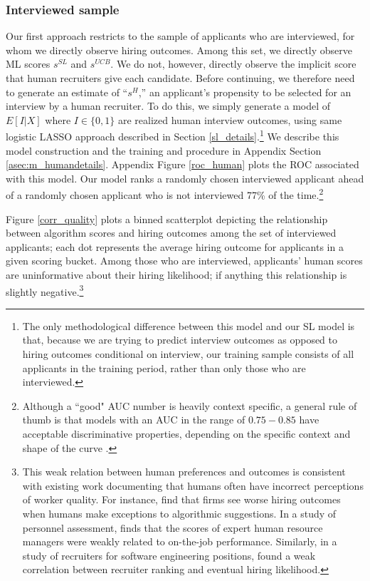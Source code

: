 \documentclass[crop,noquery,editorname,historyrev,nosurname,runningno,sepcount]{RESTUD}
\begin{document}
\subsubsection{Interviewed sample} \label{sec:intonlyres}
Our first approach restricts to the sample of applicants who are interviewed, for whom we directly observe hiring outcomes.  Among this set, we directly observe ML scores $s^{SL}$ and $s^{UCB}$.  We do not, however, directly observe the implicit score that human recruiters give each candidate.  Before continuing, we therefore need to generate an estimate of ``$s^H$,'' an applicant's propensity to be selected for an interview by a human recruiter.  To do this, we simply generate a model of $E[I|X]$ where $I \in \{0,1\}$ are realized human interview outcomes, using same logistic LASSO approach described in Section \ref{sl_details}.\footnote{The only methodological difference between this model and our SL model is that, because we are trying to predict interview outcomes as opposed to hiring outcomes conditional on interview, our training sample consists of all applicants in the training period, rather than only those who are interviewed.} We describe this model construction and the training and procedure in Appendix Section \ref{asec:m_humandetails}. Appendix Figure \ref{roc_human} plots the ROC associated with this model.  Our model ranks a randomly chosen interviewed applicant ahead of a randomly chosen applicant who is not interviewed 77\% of the time.\footnote{Although a ``good" AUC number is heavily context specific, a general rule of thumb is that models with an AUC in the range of $0.75-0.85$ have acceptable discriminative properties, depending on the specific context and shape of the curve \citep{fischer2013}.}


Figure \ref{corr_quality} plots a binned scatterplot depicting the relationship between algorithm scores and hiring outcomes among the set of interviewed applicants; each dot represents the average hiring outcome for applicants in a given scoring bucket.  Among those who are interviewed, applicants' human scores are uninformative about their hiring likelihood; if anything this relationship is slightly negative.\footnote{This weak relation between human preferences and outcomes is consistent with existing work documenting that humans often have incorrect perceptions of worker quality.  For instance, \citet{hoffman2018} find that firms see worse hiring outcomes when humans make exceptions to algorithmic suggestions.  In a study of personnel assessment, \citet{yu2020} finds that the scores of expert human resource managers were weakly related to on-the-job performance. Similarly, in a study of recruiters for software engineering positions, \citet{alineresumes2024} found a weak correlation between recruiter ranking and eventual hiring likelihood.}
\end{document}
